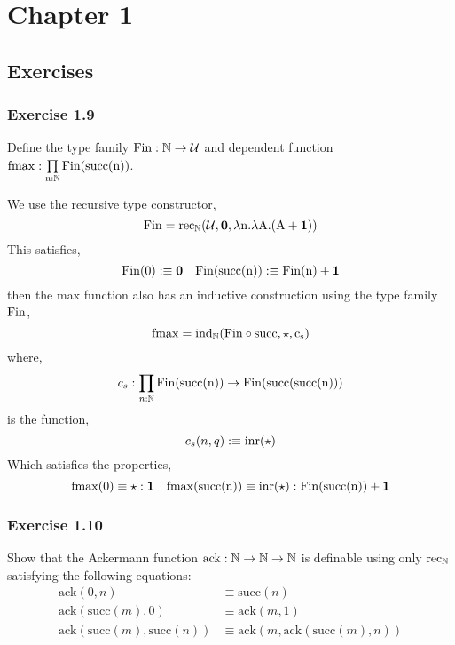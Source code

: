 \documentclass[12pt]{article}
\begin{document}
\newcommand{\rec}{\mathrm{rec}}
\newcommand{\ind}{\mathrm{ind}}
\renewcommand{\succ}{\mathrm{succ}}
\newcommand{\pr}{\mathrm{pr}}

\section{Chapter 1}

\subsection{Exercises}

\subsubsection{Exercise 1.9}

\begin{exercise}
Define the type family $\rm{Fin} : \mathbb{N} \to \mathcal{U}$ and dependent function $\rm{fmax} : \prod\limits_{n : \N} \rm{Fin}(\succ(n))$.
\end{exercise}

We use the recursive type constructor,
\[ \rm{Fin} = \rec_{\N}(\U, \bf{0}, \lambda n. \lambda A. (A + \bf{1})) \]
This satisfies,
\[ \rm{Fin}(0) :\equiv \bf{0} \quad \rm{Fin}(\succ(n)) :\equiv \rm{Fin}(n) + \bf{1} \] 
then the max function also has an inductive construction using the type family $\rm{Fin}$,
\[ \rm{fmax} = \ind_{\N}(\rm{Fin} \circ \succ, \star, c_s) \]
where,
\[ c_s : \prod_{n : \N} \rm{Fin}(\succ(n)) \to \rm{Fin}(\succ(\succ(n))) \]
is the function,
\[ c_s(n, q) :\equiv \rm{inr}(\star) \]
Which satisfies the properties,
\[ \rm{fmax}(0) \equiv \star : \bf{1} \quad \rm{fmax}(\succ(n)) \equiv \rm{inr}(\star) : \rm{Fin}(\succ(n)) + \bf{1} \]

\subsubsection{Exercise 1.10}

\newcommand{\ack}{\mathrm{ack}}

\begin{exercise}
Show that the Ackermann function $\ack : \N \to \N \to \N$ is definable using only $\rec_{\N}$ satisfying the following equations:
\begin{align*}
\ack(0,n) & \equiv \succ(n)
\\
\ack(\succ(m), 0) & \equiv \ack(m, 1)
\\
\ack(\succ(m), \succ(n)) & \equiv \ack(m, \ack(\succ(m), n))
\end{align*}
\end{exercise}
\end{document}
